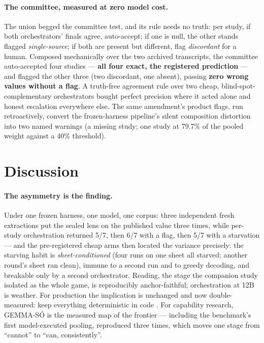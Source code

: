 \documentclass[11pt]{article}
\begin{document}
\paragraph{The committee, measured at zero model cost.} The union begged the committee test, and its rule needs no truth: per study, if both orchestrators' finals agree, auto-accept; if one is null, the other stands flagged \emph{single-source}; if both are present but different, flag \emph{discordant} for a human. Composed mechanically over the two archived transcripts, the committee auto-accepted four studies --- \textbf{all four exact, the registered prediction} --- and flagged the other three (two discordant, one absent), passing \textbf{zero wrong values without a flag}. A truth-free agreement rule over two cheap, blind-spot-complementary orchestrators bought perfect precision where it acted alone and honest escalation everywhere else. The same amendment's product flags, run retroactively, convert the frozen-harness pipeline's silent composition distortion into two named warnings (a missing study; one study at 79.7\% of the pooled weight against a 40\% threshold).

\section{Discussion}

\paragraph{The asymmetry is the finding.} Under one frozen harness, one model, one corpus: three independent fresh extractions put the sealed lens on the published value three times, while per-study orchestration returned 5/7, then 6/7 with a flag, then 5/7 with a starvation --- and the pre-registered cheap arms then located the variance precisely: the starving habit is \emph{sheet-conditioned} (four runs on one sheet all starved; another round's sheet ran clean), immune to a second run and to greedy decoding, and breakable only by a second orchestrator. Reading, the stage the companion study isolated as the whole game, is reproducibly anchor-faithful; orchestration at 12B is weather. For production the implication is unchanged and now double-measured: keep everything deterministic in code \citep{barra2026extrai2}. For capability research, GEMMA-S\'O is the measured map of the frontier --- including the benchmark's first model-executed pooling, reproduced three times, which moves one stage from ``cannot'' to ``can, consistently''.
\end{document}
